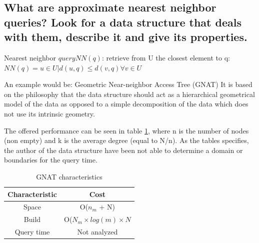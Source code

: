 \documentclass{article}
\begin{document}
\subsection{What are approximate nearest neighbor queries? Look for a data structure that deals with them, describe it and give its properties.}

Nearest neighbor $query NN(q)$: retrieve from U the closest element to q:\\
$NN(q) = { u \in U | d(u,q) \leq d(v,q) \forall v \in U}$

An example would be: Geometric Near-neighbor Access Tree (GNAT)
It is based on the philosophy that the data structure should act as a hierarchical geometrical model of the data as opposed to a simple decomposition of the data which does not use its intrinsic geometry.

The offered performance can be seen in table \ref{table:gnat}, where n is the number of nodes (non empty) and k is the average degree (equal to N/n). As the tables specifies, the author of the data structure have been not able to determine a domain or boundaries for the query time. \citep{GNAT}

\begin{table}[H]
    \centering
    \begin{tabular}{cc}
    \hline
    Characteristic & Cost           \\ \hline
    Space          & O($n_m$ + N)      \\
    Build          & O($N_m \times log (m)\times N$ \\
    Query time     & Not analyzed   \\ \hline
    \end{tabular}
    \caption{GNAT characteristics}
    \label{table:gnat}
\end{table}




\end{document}
